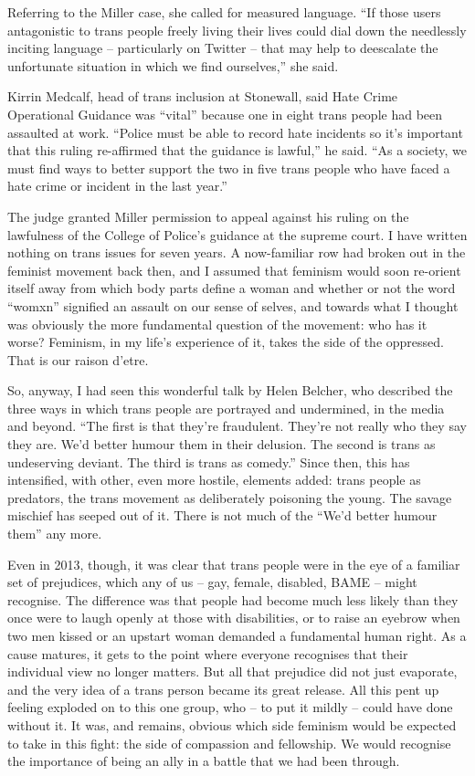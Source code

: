 Referring to the Miller case, she called for measured language. “If those users antagonistic to trans people freely living their lives could dial down the needlessly inciting language – particularly on Twitter – that may help to deescalate the unfortunate situation in which we find ourselves,” she said.

Kirrin Medcalf, head of trans inclusion at Stonewall, said Hate Crime Operational Guidance was “vital” because one in eight trans people had been assaulted at work. “Police must be able to record hate incidents so it’s important that this ruling re-affirmed that the guidance is lawful,” he said. “As a society, we must find ways to better support the two in five trans people who have faced a hate crime or incident in the last year.”

The judge granted Miller permission to appeal against his ruling on the lawfulness of the College of Police’s guidance at the supreme court.
I have written nothing on trans issues for seven years. A now-familiar row had broken out in the feminist movement back then, and I assumed that feminism would soon re-orient itself away from which body parts define a woman and whether or not the word “womxn” signified an assault on our sense of selves, and towards what I thought was obviously the more fundamental question of the movement: who has it worse? Feminism, in my life’s experience of it, takes the side of the oppressed. That is our raison d’etre.

So, anyway, I had seen this wonderful talk by Helen Belcher, who described the three ways in which trans people are portrayed and undermined, in the media and beyond. “The first is that they’re fraudulent. They’re not really who they say they are. We’d better humour them in their delusion. The second is trans as undeserving deviant. The third is trans as comedy.” Since then, this has intensified, with other, even more hostile, elements added: trans people as predators, the trans movement as deliberately poisoning the young. The savage mischief has seeped out of it. There is not much of the “We’d better humour them” any more.

Even in 2013, though, it was clear that trans people were in the eye of a familiar set of prejudices, which any of us – gay, female, disabled, BAME – might recognise. The difference was that people had become much less likely than they once were to laugh openly at those with disabilities, or to raise an eyebrow when two men kissed or an upstart woman demanded a fundamental human right. As a cause matures, it gets to the point where everyone recognises that their individual view no longer matters. But all that prejudice did not just evaporate, and the very idea of a trans person became its great release. All this pent up feeling exploded on to this one group, who – to put it mildly – could have done without it. It was, and remains, obvious which side feminism would be expected to take in this fight: the side of compassion and fellowship. We would recognise the importance of being an ally in a battle that we had been through.

